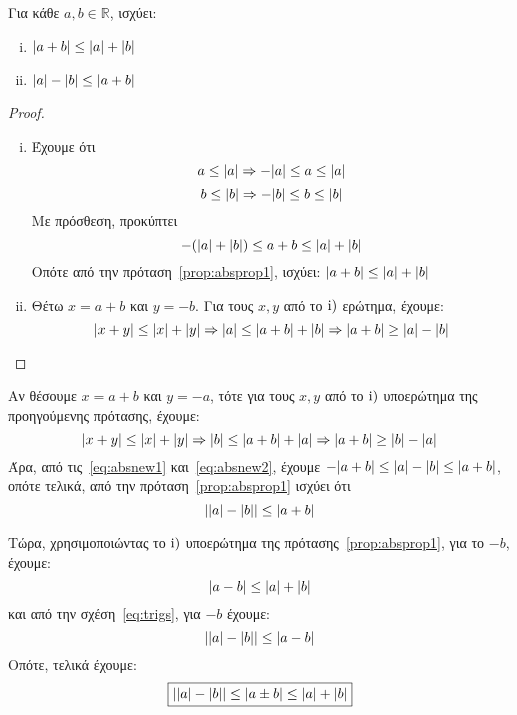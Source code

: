 \begin{mybox3}
\begin{prop}
  \label{prop:trigineq}
  Για κάθε $ a, b \in \mathbb{R} $, ισχύει:
  \begin{enumerate}[(i)]
    \item $ \abs{a+b} \leq \abs{a} + \abs{b}   $
    \item $ \abs{a} - \abs{b} \leq \abs{a+b}  $
  \end{enumerate}
\end{prop}
\end{mybox3}
\begin{proof}
\item {}
  \begin{enumerate}[(i)]
    \item Έχουμε ότι 
      \[ 
        a \leq \abs{a} \Rightarrow - \abs{a} \leq a \leq \abs{a}
      \] 
      \[
        b \leq \abs{b} \Rightarrow - \abs{b} \leq b \leq \abs{b} 
      \] 
      Με πρόσθεση, προκύπτει
      \[
        - (\abs{a} + \abs{b} ) \leq a + b \leq \abs{a} + \abs{b} 
      \] 
      Οπότε από την πρόταση~\ref{prop:absprop1}, ισχύει:
      $ \abs{a+b} \leq \abs{a} + \abs{b} $
    \item Θέτω $ x = a+b $ και $ y = -b $. Για τους $ x,y $ από το $ \rm{i}) $ 
      ερώτημα, έχουμε:
      \begin{equation}\label{eq:absnew1}
        \abs{x+y} \leq \abs{x} + \abs{y} \Rightarrow \abs{a} \leq 
        \abs{a+b} + \abs{b} \Rightarrow \abs{a+b} \geq \abs{a} - \abs{b}
      \end{equation} 
  \end{enumerate} 
\end{proof} 

\begin{rem}
  Αν θέσουμε $ x = a+b $ και $ y = -a $, τότε για τους $ x,y $ από το $ \rm{i)} $ 
  υποερώτημα της προηγούμενης πρότασης, έχουμε:
  \begin{equation}\label{eq:absnew2}
    \abs{x+y} \leq \abs{x} + \abs{y} \Rightarrow \abs{b} \leq 
    \abs{a+b} + \abs{a} \Rightarrow \abs{a+b} \geq \abs{b} - \abs{a} 
  \end{equation} 
  Άρα, από τις~\eqref{eq:absnew1} και~\eqref{eq:absnew2}, έχουμε
  $ - \abs{a+b} \leq \abs{a} - \abs{b} \leq \abs{a+b} $, οπότε τελικά, 
  από την πρόταση~\ref{prop:absprop1} ισχύει ότι
  \begin{equation}\label{eq:trigs} 
    \abs{\abs{a} - \abs{b}} \leq \abs{a+b}
  \end{equation}

  Τώρα, χρησιμοποιώντας το $ \rm{i)} $ υποερώτημα της πρότασης~\ref{prop:absprop1}, 
  για το $ -b $, έχουμε:
  \[
    \abs{a-b} \leq \abs{a} + \abs{b} 
  \] 
  και από την σχέση~\eqref{eq:trigs}, για $-b$ έχουμε:
  \[
    \abs{\abs{a} - \abs{b}} \leq \abs{a-b} 
  \]
  Οπότε, τελικά έχουμε:
  \[
    \boxed{\abs{\abs{a} - \abs{b}} \leq \abs{a \pm b} \leq \abs{a} + \abs{b}  }
  \]
\end{rem}



